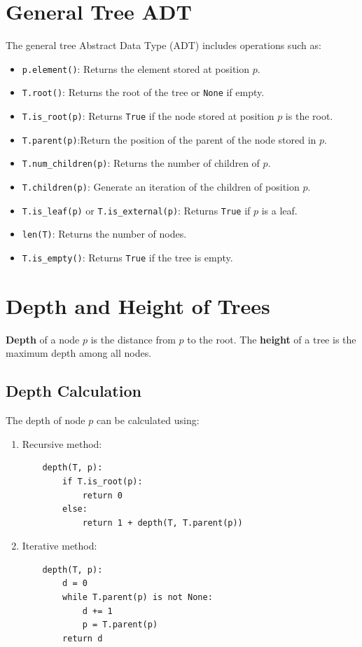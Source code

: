 \section{General Tree ADT}
The general tree Abstract Data Type (ADT) includes operations such as:
\begin{itemize}
    \item \texttt{p.element()}: Returns the element stored at position \( p \).
    \item \texttt{T.root()}: Returns the root of the tree or \texttt{None} if empty.
    \item \texttt{T.is\_root(p)}: Returns \texttt{True} if the node stored at position \( p \) is the root.
    \item \texttt{T.parent(p)}:Return the position of the parent of the node stored in \( p \).
    \item \texttt{T.num\_children(p)}: Returns the number of children of \( p \).
    \item \texttt{T.children(p)}: Generate an iteration of the children of position \( p \).
    \item \texttt{T.is\_leaf(p)} or \texttt{T.is\_external(p)}: Returns \texttt{True} if \( p \) is a leaf.
    \item \texttt{len(T)}: Returns the number of nodes.
    \item \texttt{T.is\_empty()}: Returns \texttt{True} if the tree is empty.
\end{itemize}

\section{Depth and Height of Trees}
\textbf{Depth} of a node \( p \) is the distance from \( p \) to the root. The \textbf{height} of a tree is the maximum depth among all nodes.

\subsection{Depth Calculation}
The depth of node \( p \) can be calculated using:
\begin{enumerate}
    \item Recursive method:
    \begin{verbatim}
    depth(T, p):
        if T.is_root(p):
            return 0
        else:
            return 1 + depth(T, T.parent(p))
    \end{verbatim}
    \item Iterative method:
    \begin{verbatim}
    depth(T, p):
        d = 0
        while T.parent(p) is not None:
            d += 1
            p = T.parent(p)
        return d
    \end{verbatim}
\end{enumerate}

